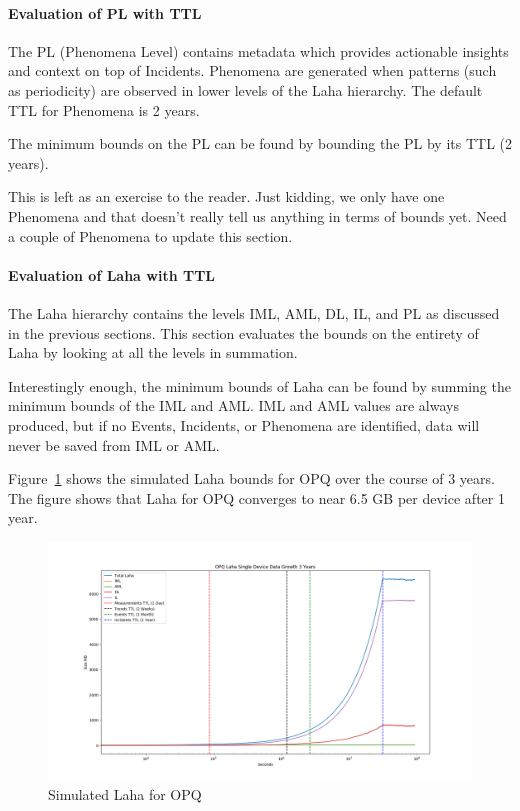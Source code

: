 \paragraph{Evaluation of PL with TTL}

The PL (Phenomena Level) contains metadata which provides actionable insights and context on top of Incidents. Phenomena are generated when patterns (such as periodicity) are observed in lower levels of the Laha hierarchy. The default TTL for Phenomena is 2 years.

The minimum bounds on the PL can be found by bounding the PL by its TTL (2 years).

This is left as an exercise to the reader. Just kidding, we only have one Phenomena and that doesn't really tell us anything in terms of bounds yet. Need a couple of Phenomena to update this section.

\paragraph{Evaluation of Laha with TTL}

The Laha hierarchy contains the levels IML, AML, DL, IL, and PL as discussed in the previous sections. This section evaluates the bounds on the entirety of Laha by looking at all the levels in summation.

Interestingly enough, the minimum bounds of Laha can be found by summing the minimum bounds of the IML and AML. IML and AML values are always produced, but if no Events, Incidents, or Phenomena are identified, data will never be saved from IML or AML\@.

Figure~\ref{fig:sim_laha_opq} shows the simulated Laha bounds for OPQ over the course of 3 years. The figure shows that Laha for OPQ converges to near 6.5 GB per device after 1 year.

\begin{figure}[H]
	\centering
	\includegraphics[width=\linewidth]{figures/sim_laha_opq.png}
	\caption{Simulated Laha for OPQ}
	\label{fig:sim_laha_opq}
\end{figure}

